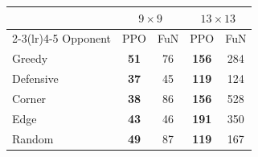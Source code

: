 \begin{table}[t]
  \centering
  \label{tab:phase1-eplen}
  \small
  \begin{tabular}{@{}l cc cc@{}}
    \toprule
    & \multicolumn{2}{c}{$9\times9$} & \multicolumn{2}{c}{$13\times13$} \\
    \cmidrule(lr){2-3}\cmidrule(lr){4-5}
    Opponent & PPO & FuN & PPO & FuN \\
    \midrule
    Greedy & \textbf{51} & 76 & \textbf{156} & 284 \\
    Defensive & \textbf{37} & 45 & \textbf{119} & 124 \\
    Corner & \textbf{38} & 86 & \textbf{156} & 528 \\
    Edge & \textbf{43} & 46 & \textbf{191} & 350 \\
    Random & \textbf{49} & 87 & \textbf{119} & 167 \\
    \bottomrule
  \end{tabular}
\end{table}
